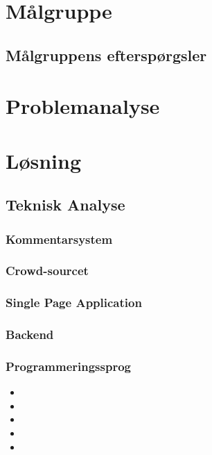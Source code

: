 \documentclass[final]{rapport1}
\begin{document}
\chapter{Målgruppe}





\section{Målgruppens efterspørgsler}


\clearpage
\chapter{Problemanalyse}

\chapter{Løsning}
\section{Teknisk Analyse}
\subsection{Kommentarsystem}


\subsection{Crowd-sourcet}

\subsection{Single Page Application}

\subsection{Backend}

\subsection{Programmeringssprog}
\begin{itemize}
\item 
\item 
\item 
\item 
\item 
\end{itemize}
\end{document}
